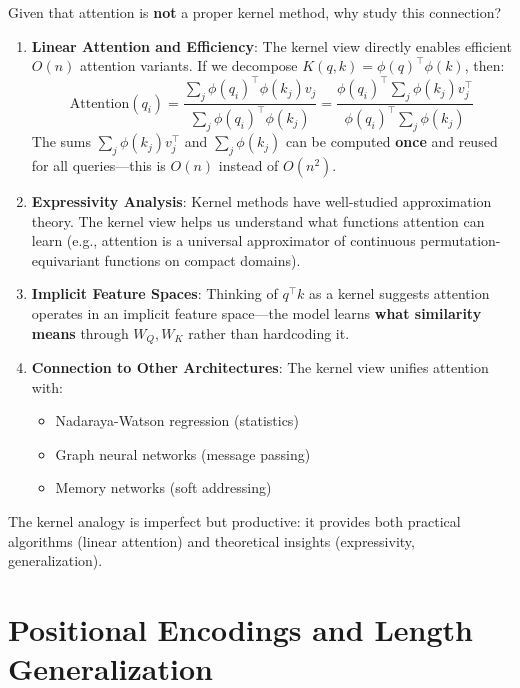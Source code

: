 \begin{remark}
    Given that attention is \textbf{not} a proper kernel method, why study this connection?

    \begin{enumerate}
        \item \textbf{Linear Attention and Efficiency}: The kernel view directly enables efficient $O(n)$ attention variants. If we decompose $K(q, k) = \phi(q)^\top \phi(k)$, then:
        \[
            \text{Attention}(q_i) = \frac{\sum_j \phi(q_i)^\top \phi(k_j) v_j}{\sum_j \phi(q_i)^\top \phi(k_j)} = \frac{\phi(q_i)^\top \sum_j \phi(k_j) v_j^\top}{\phi(q_i)^\top \sum_j \phi(k_j)}
        \]
        The sums $\sum_j \phi(k_j) v_j^\top$ and $\sum_j \phi(k_j)$ can be computed \textbf{once} and reused for all queries---this is $O(n)$ instead of $O(n^2)$.

        \item \textbf{Expressivity Analysis}: Kernel methods have well-studied approximation theory. The kernel view helps us understand what functions attention can learn (e.g., attention is a universal approximator of continuous permutation-equivariant functions on compact domains).

        \item \textbf{Implicit Feature Spaces}: Thinking of $q^\top k$ as a kernel suggests attention operates in an implicit feature space---the model learns \textbf{what similarity means} through $W_Q, W_K$ rather than hardcoding it.

        \item \textbf{Connection to Other Architectures}: The kernel view unifies attention with:
        \begin{itemize}
            \item Nadaraya-Watson regression (statistics)
            \item Graph neural networks (message passing)
            \item Memory networks (soft addressing)
        \end{itemize}
    \end{enumerate}

    The kernel analogy is imperfect but productive: it provides both practical algorithms (linear attention) and theoretical insights (expressivity, generalization).
\end{remark}

\section{Positional Encodings and Length Generalization}


